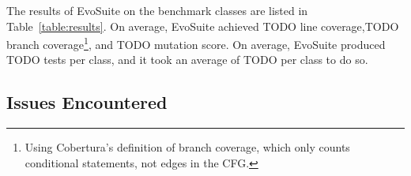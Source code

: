 \documentclass[10pt,conference,compsocconf]{IEEEtran}
\newcommand{\EVOSUITE}{{\sc EvoSuite}\xspace}
\begin{document}
\begin{table*}[t]
  \centering
  \caption{\label{table:results}Detailed results of \EVOSUITE on the SBST benchmark classes. Time is expressed in minutes.}
{}
\end{table*}


The results of \EVOSUITE on the benchmark classes are listed in
Table~\ref{table:results}. On average, \EVOSUITE achieved TODO line
coverage,TODO branch coverage\footnote{Using Cobertura's definition
  of branch coverage, which only counts conditional statements, not
  edges in the CFG.}, and TODO mutation score. On average, \EVOSUITE
produced TODO tests per class, and it took an average of TODO per class to
do so.



\subsection{Issues Encountered}

\end{document}
